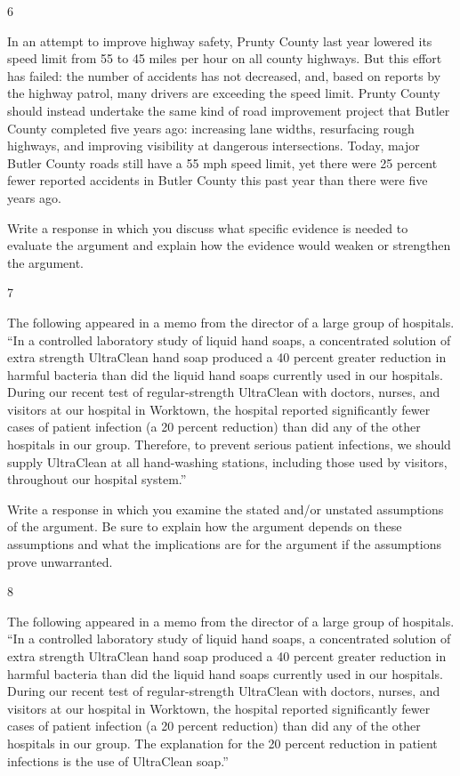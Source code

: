 \documentclass[]{article}
\begin{document}
6

In an attempt to improve highway safety, Prunty County last year lowered
its speed limit from 55 to 45 miles per hour on all county highways. But
this effort has failed: the number of accidents has not decreased, and,
based on reports by the highway patrol, many drivers are exceeding the
speed limit. Prunty County should instead undertake the same kind of
road improvement project that Butler County completed five years ago:
increasing lane widths, resurfacing rough highways, and improving
visibility at dangerous intersections. Today, major Butler County roads
still have a 55 mph speed limit, yet there were 25 percent fewer
reported accidents in Butler County this past year than there were five
years ago.

Write a response in which you discuss what specific evidence is needed
to evaluate the argument and explain how the evidence would weaken or
strengthen the argument.

7

The following appeared in a memo from the director of a large group of
hospitals. ``In a controlled laboratory study of liquid hand soaps, a
concentrated solution of extra strength UltraClean hand soap produced a
40 percent greater reduction in harmful bacteria than did the liquid
hand soaps currently used in our hospitals. During our recent test of
regular-strength UltraClean with doctors, nurses, and visitors at our
hospital in Worktown, the hospital reported significantly fewer cases of
patient infection (a 20 percent reduction) than did any of the other
hospitals in our group. Therefore, to prevent serious patient
infections, we should supply UltraClean at all hand-washing stations,
including those used by visitors, throughout our hospital system.''

Write a response in which you examine the stated and/or unstated
assumptions of the argument. Be sure to explain how the argument depends
on these assumptions and what the implications are for the argument if
the assumptions prove unwarranted.

8

The following appeared in a memo from the director of a large group of
hospitals. ``In a controlled laboratory study of liquid hand soaps, a
concentrated solution of extra strength UltraClean hand soap produced a
40 percent greater reduction in harmful bacteria than did the liquid
hand soaps currently used in our hospitals. During our recent test of
regular-strength UltraClean with doctors, nurses, and visitors at our
hospital in Worktown, the hospital reported significantly fewer cases of
patient infection (a 20 percent reduction) than did any of the other
hospitals in our group. The explanation for the 20 percent reduction in
patient infections is the use of UltraClean soap.''
\end{document}
